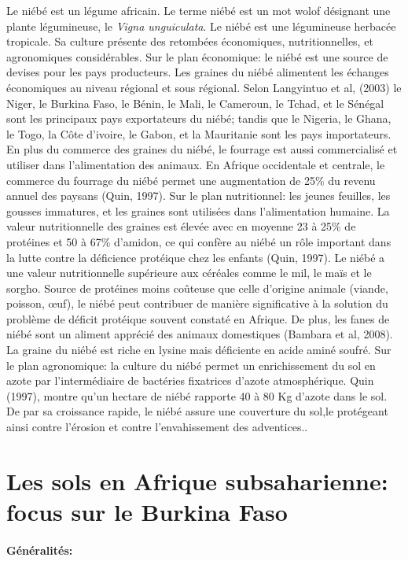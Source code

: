 \documentclass[a4paper,11pt]{article}
\begin{document}
Le niébé est un légume africain. Le terme niébé est un mot wolof
désignant une plante légumineuse, le \emph{Vigna unguiculata}. Le niébé est
une légumineuse herbacée tropicale. Sa culture présente des retombées
économiques, nutritionnelles, et agronomiques considérables. Sur le
plan économique: le niébé est une source de devises pour les pays
producteurs. Les graines du niébé alimentent les échanges économiques
au niveau régional et sous régional. Selon Langyintuo et al, (2003) le
Niger, le Burkina Faso, le Bénin, le Mali, le Cameroun, le Tchad, et
le Sénégal sont les principaux pays exportateurs du niébé; tandis que
le Nigeria, le Ghana, le Togo, la Côte d’ivoire, le Gabon, et la
Mauritanie sont les pays importateurs. En plus du commerce des graines
du niébé, le fourrage est aussi commercialisé et utiliser dans
l’alimentation des animaux. En Afrique occidentale et centrale, le
commerce du fourrage du niébé permet une augmentation de 25\% du
revenu annuel des paysans (Quin, 1997). Sur le plan nutritionnel: les
jeunes feuilles, les gousses immatures, et les graines sont utilisées
dans l’alimentation humaine. La valeur nutritionnelle des graines est
élevée avec en moyenne 23 à 25\% de protéines et 50 à 67\% d’amidon,
ce qui confère au niébé un rôle important dans la lutte contre la
déficience protéique chez les enfants (Quin, 1997). Le niébé a une
valeur nutritionnelle supérieure aux céréales comme le mil, le maïs et
le sorgho. Source de protéines moins coûteuse que celle d’origine
animale (viande, poisson, œuf), le niébé peut contribuer de manière
significative à la solution du problème de déficit protéique souvent
constaté en Afrique. De plus, les fanes de niébé sont un aliment
apprécié des animaux domestiques (Bambara et al, 2008). La graine du
niébé est riche en lysine mais déficiente en acide aminé soufré. Sur
le plan agronomique: la culture du niébé permet un enrichissement du
sol en azote par l’intermédiaire de bactéries fixatrices d’azote
atmosphérique. Quin (1997), montre qu’un hectare de niébé rapporte
 40 à 80 Kg d’azote dans le sol. De par sa croissance rapide, le niébé
assure une couverture du sol,le protégeant ainsi contre l’érosion et
contre l’envahissement des adventices.\cite{Doggett_1988}.

\section{Les sols en Afrique subsaharienne: focus sur le Burkina Faso}

\paragraph{Généralités:}
\end{document}
